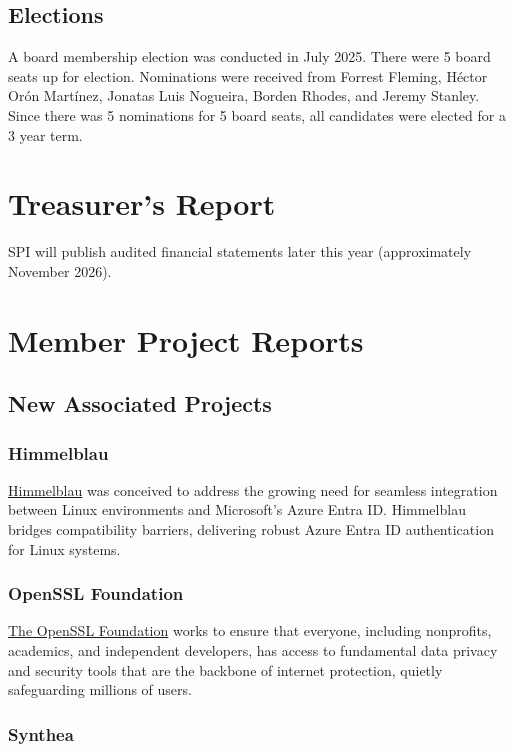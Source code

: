 \documentclass[a4paper]{report}
\begin{document}
\section{Elections}

A board membership election was conducted in July 2025.  There were 5 board seats up for election.  Nominations were received from Forrest Fleming, Héctor Orón Martínez, Jonatas Luis Nogueira, Borden Rhodes, and Jeremy Stanley.  Since there was 5 nominations for 5 board seats, all candidates were elected for a 3 year term.

\chapter{Treasurer's Report}

SPI will publish audited financial statements later this year (approximately November 2026).

\chapter{Member Project Reports}

\section{New Associated Projects}

\subsection{Himmelblau}

\href{https://himmelblau-idm.org/}{Himmelblau} was conceived to address the growing need for seamless integration between Linux environments and Microsoft's Azure Entra ID. Himmelblau bridges compatibility barriers, delivering robust Azure Entra ID authentication for Linux systems.

\subsection{OpenSSL Foundation}

\href{https://openssl.foundation/}{The OpenSSL Foundation} works to ensure that everyone, including nonprofits, academics, and independent developers, has access to fundamental data privacy and security tools that are the backbone of internet protection, quietly safeguarding millions of users.

\subsection{Synthea}
\end{document}
